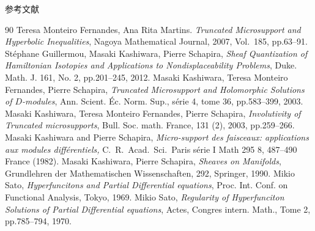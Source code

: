 \documentclass[dvipdfmx,10pt,aspectratio=169,leqno]{beamer}%
\numberwithin{equation}{subsection}
\theoremstyle{mystyle}
\begin{document}
\begin{frame}[allowframebreaks]{参考文献}
  \begin{thebibliography}{90}\beamertemplatetextbibitems
   Teresa Monteiro Fernandes, Ana Rita Martins. 
  \textit{Truncated Microsupport and Hyperbolic Inequalities}, 
  Nagoya Mathematical Journal, 2007, Vol.\ 185, pp.63--91. 
   St\'ephane Guillermou, 
  Masaki Kashiwara, Pierre Schapira, 
  \textit{Sheaf Quantization of Hamiltonian Isotopies and Applications to Nondisplaceability Problems}, 
  Duke. Math. J. 161, No. 2, pp.201--245, 2012.  
   Masaki Kashiwara, Teresa Monteiro Fernandes, Pierre Schapira, 
  \textit{Truncated Microsupport and Holomorphic Solutions 
  of \(D\)-modules}, 
  Ann. Scient. \'Ec. Norm. Sup., s\'erie 4, tome 36, 
  pp.583--399, 2003.
   Masaki Kashiwara, Teresa Monteiro Fernandes, Pierre Schapira, 
  \textit{Involutivity of Truncated microsupports}, 
  Bull. Soc. math. France, 131 (2), 2003, 
  pp.259--266.
   Masaki Kashiwara and Pierre Schapira,
  \textit{Micro-support des faisceaux: applications 
  aux modules diff{\'e}rentiels,}
  C.~R.~Acad.\ Sci.\ Paris s{\'e}rie I Math 295 8, 487--490 France (1982).
   Masaki Kashiwara, Pierre Schapira, 
  \textit{Sheaves on Manifolds}, 
  Grundlehren der Mathematischen Wissenschaften, 292, Springer, 1990.
   Mikio Sato, 
  \textit{Hyperfuncitons and 
  Partial Differential equations}, 
  Proc. Int. Conf. on Functional Analysis, Tokyo, 1969.
   Mikio Sato, 
  \textit{Regularity of Hyperfunciton Solutions of 
  Partial Differential equations}, 
  Actes, Congres intern. Math., 
  Tome 2, pp.785--794, 1970.
\end{thebibliography}
\end{frame}

\end{document}
